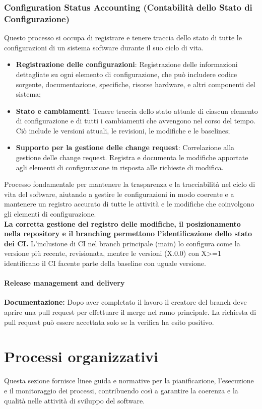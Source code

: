 \documentclass{article}
\begin{document}
\subsubsection{Configuration Status Accounting (Contabilità dello Stato di Configurazione)}
Questo processo si occupa di registrare e tenere traccia dello stato di tutte le configurazioni di un sistema software durante il suo ciclo di vita.
\begin{itemize}
    \item \textbf{Registrazione delle configurazioni}: Registrazione delle informazioni dettagliate su ogni elemento di configurazione, che può includere codice sorgente, documentazione, specifiche, risorse hardware, e altri componenti del sistema;
    \item \textbf{Stato e cambiamenti}: Tenere traccia dello stato attuale di ciascun elemento di configurazione e di tutti i cambiamenti che avvengono nel corso del tempo. Ciò include le versioni attuali, le revisioni, le modifiche e le baselines;
    \item \textbf{Supporto per la gestione delle change request}: Correlazione alla gestione delle change request. Registra e documenta le modifiche apportate agli elementi di configurazione in risposta alle richieste di modifica.
\end{itemize}
Processo fondamentale per mantenere la trasparenza e la tracciabilità nel ciclo di vita del software, aiutando a gestire le configurazioni in modo coerente e a mantenere un registro accurato di tutte le attività e le modifiche che coinvolgono gli elementi di configurazione.\\
\textbf{La corretta gestione del registro delle modifiche, il posizionamento nella repository e il branching permettono l'identificazione dello stato dei CI.}
L'inclusione di CI nel branch principale (main) lo configura come la versione più recente, revisionata, mentre le versioni (X.0.0) con X>=1 identificano il CI facente parte della baseline con uguale versione.%
\paragraph{Release management and delivery}
\textbf{Documentazione:}
Dopo aver completato il lavoro il creatore del branch deve aprire una pull request per effettuare il merge nel ramo principale. La richiesta di pull request può essere accettata solo se la verifica ha esito positivo.
\section{Processi organizzativi}
Questa sezione fornisce linee guida e normative per la pianificazione, l'esecuzione e il monitoraggio dei processi, contribuendo così a garantire la coerenza e la qualità nelle attività di sviluppo del software.
\end{document}
